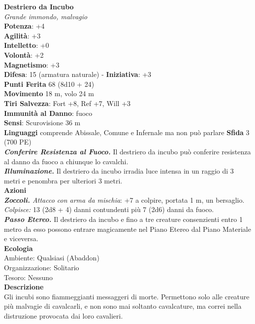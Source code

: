 \begin{multicols}{2}
\medskip\textbf{Destriero da Incubo}\\
\emph{Grande immondo, malvagio}\\
\textbf{Potenza}: +4\\
\textbf{Agilità}: +3\\
\textbf{Intelletto}: +0\\
\textbf{Volontà}: +2\\
\textbf{Magnetismo}: +3\\
\textbf{Difesa}: 15 (armatura naturale) - \textbf{Iniziativa}: +3\\
\textbf{Punti Ferita} 68 (8d10 + 24)\\
\textbf{Movimento} 18 m, volo 24 m\\
\textbf{Tiri Salvezza}: Fort +8, Ref +7, Will +3\\
\textbf{Immunità al Danno}: fuoco\\
\textbf{Sensi}: Scurovisione 36 m\\
\textbf{Linguaggi} comprende Abissale, Comune e Infernale ma non può parlare
\textbf{Sfida} 3 (700 PE)\smallskip\\
\emph{\textbf{Conferire Resistenza al Fuoco.}} Il destriero da incubo può conferire resistenza al danno da fuoco a chiunque lo cavalchi.\\
\emph{\textbf{Illuminazione.}} Il destriero da incubo irradia luce intensa in un raggio di 3 metri e penombra per ulteriori 3 metri.\\
\smallskip\textbf{Azioni}\\
\emph{\textbf{Zoccoli.} Attacco con arma da mischia}: +7 a colpire, portata 1 m, un bersaglio.\\
\emph{Colpisce:} 13 (2d8 + 4) danni contundenti più 7 (2d6) danni da fuoco.\\
\emph{\textbf{Passo Etereo.}} Il destriero da incubo e fino a tre creature consenzienti entro 1 metro da esso possono entrare magicamente nel Piano Etereo dal Piano Materiale e viceversa.\\
\textbf{Ecologia}\\
Ambiente: Qualsiasi (Abaddon)\\
Organizzazione: Solitario\\
Tesoro: Nessuno\\
\textbf{Descrizione}\\
Gli incubi sono fiammeggianti messaggeri di morte. Permettono solo alle creature più malvagie di cavalcarli, e non sono mai soltanto cavalcature, ma correi nella distruzione provocata dai loro cavalieri.\\


\end{multicols}
